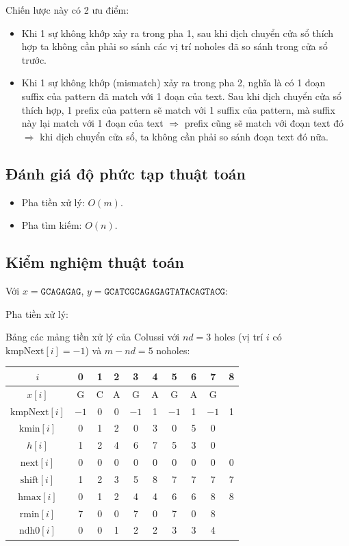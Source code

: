 \documentclass[12pt,twoside,openright]{extreport}
\begin{document}
Chiến lược này có 2 ưu điểm:
\begin{itemize}
	\item Khi 1 sự không khớp xảy ra trong pha 1, sau khi dịch chuyển cửa sổ thích hợp ta không cần phải so sánh các vị trí noholes đã so sánh trong cửa sổ trước.
	\item Khi 1 sự không khớp (mismatch) xảy ra trong pha 2, nghĩa là có 1 đoạn suffix của pattern đã match với 1 đoạn của text. Sau khi dịch chuyển cửa sổ thích hợp, 1 prefix của pattern sẽ match với 1 suffix của pattern, mà suffix này lại match với 1 đoạn của text $\Rightarrow$ prefix cũng sẽ match với đoạn text đó $\Rightarrow$ khi dịch chuyển cửa sổ, ta không cần phải so sánh đoạn text đó nữa.
\end{itemize}

\subsection{Đánh giá độ phức tạp thuật toán}

\begin{itemize}
	\item Pha tiền xử lý: $O(m)$.
	\item Pha tìm kiếm: $O(n)$.
\end{itemize}

\subsection{Kiểm nghiệm thuật toán}

Với $x = \texttt{GCAGAGAG}$, $y = \texttt{GCATCGCAGAGAGTATACAGTACG}$:

Pha tiền xử lý:

Bảng các mảng tiền xử lý của Colussi với $nd = 3$ holes (vị trí $i$ có $\text{kmpNext}[i]=-1$) và $m-nd=5$ noholes:

\begin{center}
\begin{tabular}{|c|c|c|c|c|c|c|c|c|c|}
\hline
$i$           & 0  & 1 & 2 & 3  & 4 & 5  & 6 & 7  & 8 \\
\hline
$x[i]$        & G  & C & A & G  & A & G  & A & G  &   \\
\hline
$\text{kmpNext}[i]$ & $-1$ & 0 & 0 & $-1$ & 1 & $-1$ & 1 & $-1$ & 1 \\
\hline
$\text{kmin}[i]$    & 0  & 1 & 2 & 0  & 3 & 0  & 5 & 0  &   \\
\hline
$h[i]$        & 1  & 2 & 4 & 6  & 7 & 5  & 3 & 0  &   \\
\hline
$\text{next}[i]$    & 0  & 0 & 0 & 0  & 0 & 0  & 0 & 0  & 0 \\
\hline
$\text{shift}[i]$   & 1  & 2 & 3 & 5  & 8 & 7  & 7 & 7  & 7 \\
\hline
$\text{hmax}[i]$    & 0  & 1 & 2 & 4  & 4 & 6  & 6 & 8  & 8 \\
\hline
$\text{rmin}[i]$    & 7  & 0 & 0 & 7  & 0 & 7  & 0 & 8  &   \\
\hline
$\text{ndh0}[i]$    & 0  & 0 & 1 & 2  & 2 & 3  & 3 & 4  &   \\
\hline
\end{tabular}
\end{center}
\end{document}
